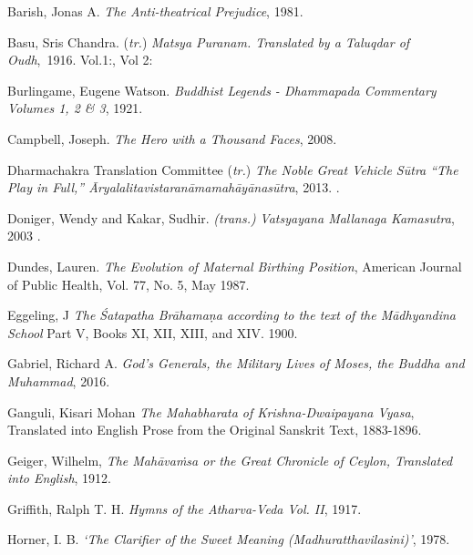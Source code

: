 \label{footprints_split_023.html_Barishux201981}
Barish, Jonas A. \emph{The Anti-theatrical Prejudice}, 1981.

\label{footprints_split_023.html_Basuux201916}
Basu, Sris Chandra. (\emph{tr.}) \emph{Matsya Puranam. Translated by a
Taluqdar of Oudh},~1916. Vol.1:, Vol 2:

\label{footprints_split_023.html_Burlingameux201921}
Burlingame, Eugene Watson. \emph{Buddhist Legends - Dhammapada
Commentary Volumes 1, 2 \& 3}, 1921.

\label{footprints_split_023.html_Campbellux202008}
Campbell, Joseph. \emph{The Hero with a Thousand Faces}, 2008.

\label{footprints_split_023.html_Dharmachakraux202013}
Dharmachakra Translation Committee (\emph{tr.}) \emph{The Noble Great
Vehicle Sūtra ``The Play in Full,''
{Āryalalitavistaranāmamahāyānasūtra}}, 2013. .

\label{footprints_split_023.html_Donigerux20andux20Kakarux202003}
Doniger, Wendy and Kakar, Sudhir. \emph{(trans.)} \emph{Vatsyayana
Mallanaga Kamasutra}, 2003 .

\label{footprints_split_023.html_Dundesux201987}
Dundes, Lauren. \emph{The Evolution of Maternal Birthing Position},
American Journal of Public Health, Vol. 77, No. 5, May 1987.

\label{footprints_split_023.html_Eggelingux201900}
Eggeling, J \emph{The Śatapatha Brāhamaṇa according to the text of the
Mādhyandina School} Part V, Books XI, XII, XIII, and XIV. 1900.

\label{footprints_split_023.html_Gabrielux202016}
Gabriel, Richard A. \emph{God's Generals, the Military Lives of Moses,
the Buddha and Muhammad}, 2016.

\label{footprints_split_023.html_Ganguliux201896}
Ganguli, Kisari Mohan \emph{The Mahabharata of Krishna-Dwaipayana
Vyasa}, Translated into English Prose from the Original Sanskrit Text,
1883-1896.

\label{footprints_split_023.html_Geigerux201912}
Geiger, Wilhelm, \emph{The Mahāvaṁsa or the Great Chronicle of Ceylon,
Translated into English}, 1912.

\label{footprints_split_023.html_Griffithux201917}
Griffith, Ralph T. H. \emph{Hymns of the Atharva-Veda Vol. II}, 1917.

\label{footprints_split_023.html_Hornerux20IBux201978}
Horner, I. B. \emph{`The Clarifier of the Sweet Meaning
(Madhuratthavilasini)'}, 1978.

